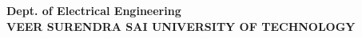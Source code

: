 \documentclass[12pt,oneside,a4paper]{Thesis_PG}
\begin{document}
\begin{center}
\large \textbf{Dept. of Electrical Engineering}
\\\large \textbf{VEER SURENDRA SAI UNIVERSITY OF TECHNOLOGY}
\\{ }
\end{center} 
\end{document}
